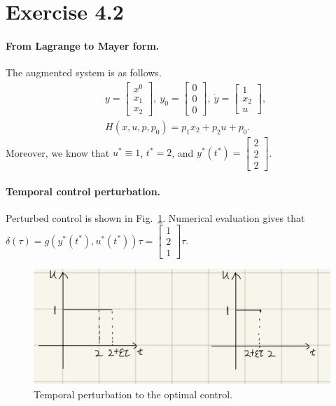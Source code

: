 \documentclass[11pt]{report}
\begin{document}

\section*{Exercise 4.2}
\paragraph{From Lagrange to Mayer form.} The augmented system is as follows.
\begin{align*}
&y = \begin{bmatrix}x^0\\x_1\\x_2\end{bmatrix},~y_0 = \begin{bmatrix}0\\0\\0\end{bmatrix},~\dot{y} = \begin{bmatrix}1\\x_2\\u\end{bmatrix},\\
&H(x,u,p,p_0) = p_1 x_2 + p_2 u + p_0.
\end{align*}
Moreover, we know that $u^* \equiv 1$, $t^* = 2$, and $y^*(t^*) = \begin{bmatrix}2\\2\\2\end{bmatrix}$.
\paragraph{Temporal control perturbation.} Perturbed control is shown in Fig.~\ref{fig:temporal_control_perturbation}. Numerical evaluation gives that $\delta(\tau) = g(y^*(t^*), u^*(t^*))\tau = \begin{bmatrix}1\\2\\1\end{bmatrix}\tau$.
\begin{figure}[H]
    \centering
    \includegraphics[width=\textwidth]{ECE553/hw6/IMG_0040.PNG}
    \caption{Temporal perturbation to the optimal control.}
    \label{fig:temporal_control_perturbation}
\end{figure}
\end{document}
